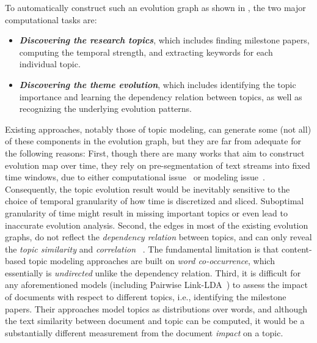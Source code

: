 To automatically construct such an evolution graph as shown in ,
the two major computational tasks are:
\begin{itemize}
\item \textbf{\emph{Discovering the research topics}}, which includes finding
  milestone papers, computing the temporal strength, and extracting keywords for
  each individual topic.
\item \textbf{\emph{Discovering the theme evolution}}, which includes
  identifying the topic importance and learning the dependency relation between
  topics, as well as recognizing the underlying evolution patterns.
\end{itemize}

Existing approaches, notably those of topic modeling, can generate some (not
all) of these components in the evolution graph, but they are far from adequate
for the following reasons: First, though there are many works that aim to
construct evolution map over time, they rely on pre-segmentation of text streams
into fixed time windows, due to either computational
issue~\cite{blei2006dynamic,mei2005discovering,wang2006topics} or modeling
issue~\cite{wang2012continuous}. Consequently, the topic evolution result would
be inevitably sensitive to the choice of temporal granularity of how time is
discretized and sliced. Suboptimal granularity of time might result in missing
important topics or even lead to inaccurate evolution analysis.  Second, the
edges in most of the existing evolution graphs, do not reflect the
\emph{dependency relation} between topics, and can only reveal the \emph{topic
similarity} and \emph{correlation}
~\cite{blei2006dynamic,blei2007correlated,mei2005discovering,wang2012continuous}.
The fundamental limitation is that content-based topic modeling approaches are
built on \emph{word co-occurrence}, which essentially is \emph{undirected}
unlike the dependency relation.  Third, it is difficult for any aforementioned
models (including Pairwise Link-LDA~\cite{nallapati2008joint}) to assess the
impact of documents with respect to different topics, i.e., identifying the
milestone papers. Their approaches model topics as distributions over words, and
although the text similarity between document and topic can be computed, it
would be a substantially different measurement from the document \emph{impact}
on a topic.

